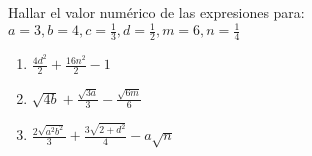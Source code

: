 \begin{frame}

Hallar el valor numérico de las expresiones para:
$a =3, b=4, c=\frac{1}{3}, d=\frac{1}{2}, m=6, n=\frac{1}{4}$

\begin{enumerate}
\item $\frac{4d^2}{2} + \frac{16n^2}{2} - 1$
\item $\sqrt{4b} + \frac{\sqrt{3a}}{3} - \frac{\sqrt{6m}}{6}$
\item $\frac{2\sqrt{a^2b^2}}{3} + \frac{3\sqrt{2+d^2}}{4} - a \sqrt{n}$
\end{enumerate}

\end{frame}


